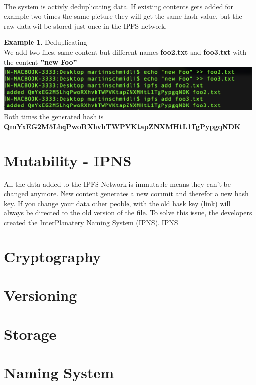 \documentclass[a4paper,11pt, oneside]{report}
\theoremstyle{definition}
\newtheorem{exmp}{Example}[subsection]
\begin{document}
\noindent \\[0.3cm]
The system is activly deduplicating data. If existing contents gets added for example two times the same picture they will get the same hash value, but the raw data wil be stored just once in the IPFS network.
\begin{exmp}Deduplicating\\[0.3cm]
	We add two files, same content but different names \textbf{foo2.txt} and \textbf{foo3.txt} with the content \textbf{''new Foo''}\\[0.3cm]
	\includegraphics[width=\textwidth]{img/addFile06.png}\\[0.3cm]
	Both times the generated hash is \\ \textbf{QmYxEG2M5LhqPwoRXhvhTWPVKtapZNXMHtL1TgPypgqNDK}
\end{exmp}

\newpage
\section{Mutability - IPNS}
All the data added to the IPFS Network is immutable means they can't be changed anymore. New content generates a new commit and therefor a new hash key. If you change your data other peoble, with the old hask key (link) will always be directed to the old version of the file. To solve this issue, the developers created the InterPlanatery Naming System (IPNS). IPNS


\newpage

\section{Cryptography}
\section{Versioning}
\section{Storage}
\section{Naming System}
\end{document}
